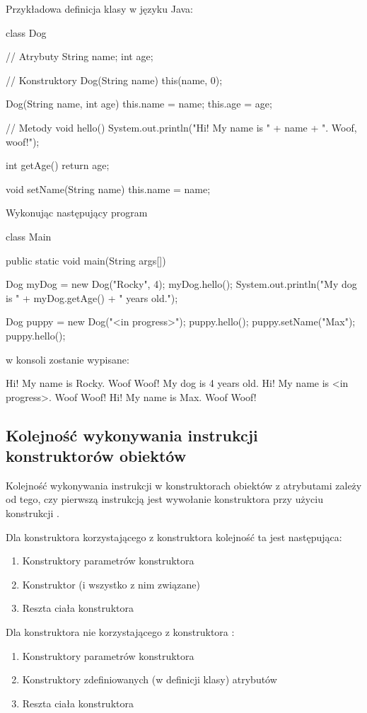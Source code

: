 \begin{example}
Przykładowa definicja klasy w języku Java:
\begin{java}
class Dog {
    
    // Atrybuty
    String name;
    int age;

    // Konstruktory
    Dog(String name) {
        this(name, 0);
    }
    
    Dog(String name, int age) {
        this.name = name;
        this.age = age;
    }

    // Metody
    void hello() {
        System.out.println("Hi! My name is " + name + ". Woof, woof!");
    }
    
    int getAge() {
        return age;
    }
    
    void setName(String name) {
        this.name = name;
    }
}
\end{java}

Wykonując następujący program
\begin{java}
class Main {
    public static void main(String args[]) {
        Dog myDog = new Dog("Rocky", 4);
        myDog.hello();
        System.out.println("My dog is " + myDog.getAge() + " years old.");
      
        Dog puppy = new Dog("<in progress>");
        puppy.hello();
        puppy.setName("Max");
        puppy.hello();
    }
}
\end{java}
w konsoli zostanie wypisane:
\begin{plain}
    Hi! My name is Rocky. Woof Woof!
    My dog is 4 years old.
    Hi! My name is <in progress>. Woof Woof!
    Hi! My name is Max. Woof Woof!
\end{plain}
\end{example}

\subsection{Kolejność wykonywania instrukcji konstruktorów obiektów}
Kolejność wykonywania instrukcji w konstruktorach obiektów z atrybutami zależy od tego, czy pierwszą instrukcją jest wywołanie konstruktora przy użyciu konstrukcji .

Dla konstruktora korzystającego z konstruktora  kolejność ta jest następująca:
\begin{enumerate}
    \item Konstruktory parametrów konstruktora
    \item Konstruktor  (i wszystko z nim związane)
    \item Reszta ciała konstruktora
\end{enumerate}
Dla konstruktora nie korzystającego z konstruktora :
\begin{enumerate}
    \item Konstruktory parametrów konstruktora
    \item Konstruktory zdefiniowanych (w definicji klasy) atrybutów
    \item Reszta ciała konstruktora
\end{enumerate}

